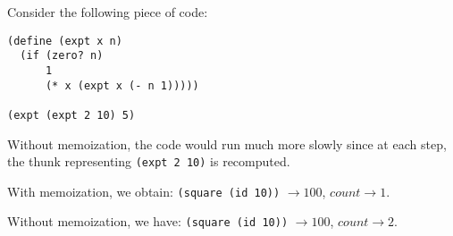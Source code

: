 \documentclass[a4paper,12pt]{article}
\begin{document}
Consider the following piece of code:
\begin{lstlisting}
(define (expt x n)
  (if (zero? n)
      1
      (* x (expt x (- n 1)))))

(expt (expt 2 10) 5)
\end{lstlisting}

Without memoization, the code would run much more slowly since at each
step, the thunk representing \lstinline!(expt 2 10)! is recomputed.

With memoization, we obtain: \lstinline!(square (id 10))! $\rightarrow
100$, $count \rightarrow 1$.

Without memoization, we have: \lstinline!(square (id 10))!
$\rightarrow 100$, $count \rightarrow 2$.
\end{document}
